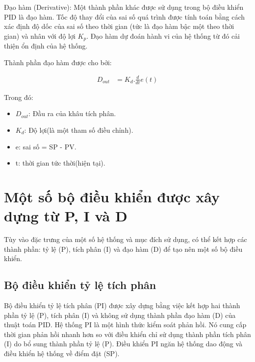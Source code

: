 Đạo hàm (Derivative): Một thành phần khác được sử dụng trong bộ điều khiển PID là đạo hàm. Tốc độ thay đổi của sai số quá trình được tính toán bằng cách xác định độ dốc của sai số theo thời gian (tức là đạo hàm bậc một theo thời gian) và nhân với độ lợi $K_p$. Đạo hàm dự đoán hành vi của hệ thống từ đó cải thiện ổn định của hệ thống.

Thành phần đạo hàm được cho bởi:

\begin{align}
	D_{out} &= K_d.\frac{d}{dt}e(t)
\end{align}

Trong đó:

\begin{itemize}
	
	\item $D_{out}$: Đầu ra của khâu tích phân.
	\item $K_d$: Độ lợi(là một tham số điều chỉnh).
	\item e: sai số = SP - PV.
	\item t: thời gian tức thời(hiện tại).
	
\end{itemize}








\section{Một số bộ điều khiển được xây dựng từ P, I và D}

Tùy vào đặc trưng của một số hệ thống và mục đích sử dụng, có thể kết hợp các thành phần: tỷ lệ (P), tích phân (I) và đạo hàm (D) để tạo nên một số bộ điều khiển.


\subsection{Bộ điều khiển tỷ lệ tích phân}

Bộ điều khiển tỷ lệ tích phân (PI) được xây dựng bằng việc kết hợp hai thành phần tỷ lệ (P), tích phân (I) và không sử dụng thành phần đạo hàm (D) của thuật toán PID. Hệ thống PI là một hình thức kiểm soát phản hồi. Nó cung cấp thời gian phản hồi nhanh hơn so với điều khiển chỉ sử dụng thành phần tích phân (I) do bổ sung thành phần tỷ lệ (P). Điều khiển PI ngăn hệ thống dao động và điều khiển hệ thống về điểm đặt (SP).

